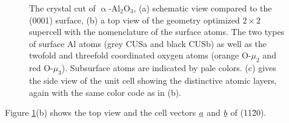\documentclass[11pt,DIV=13,BCOR=5mm,a4paper,headinclude]{scrbook}
\begin{document}
\begin{figure}[!h]
    \centering
             \quad
             \quad
             \caption{The crystal cut of $\upalpha$-Al$_2$O$_3$, (a) schematic view compared to the (0001) surface, (b) a top view of the geometry optimized $2\times 2$ supercell with the nomenclature of the surface atoms.
The two types of surface Al atoms (grey CUSa and black CUSb) as well as the twofold and threefold coordinated oxygen atoms (orange O-$\mu_2$ and red O-$\mu_3$).
Subsurface atoms are indicated by pale colors.
(c) gives the side view of the unit cell showing the distinctive atomic layers, again with the same color code as in (b).}
            \label{abb:crystal_11-20}
\end{figure}
Figure \ref{abb:crystal_11-20}(b) shows the top view and the cell vectors $\uline{a}$ and $\uline{b}$ of (11\=20).
\end{document}
